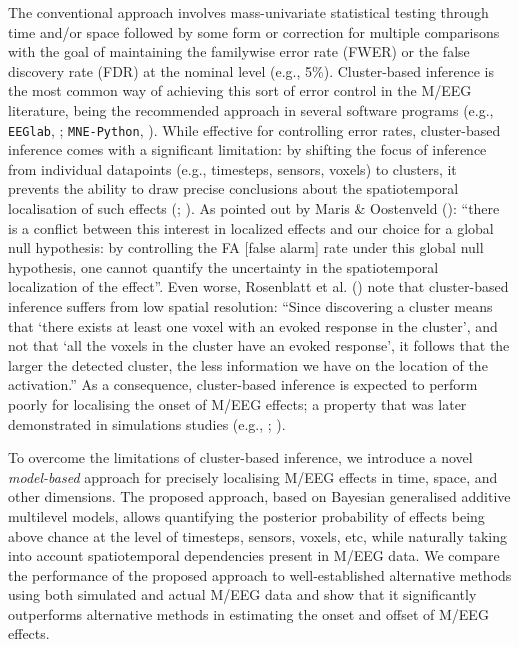 \documentclass[
  doc,
  floatsintext,
  longtable,
  a4paper,
  nolmodern,
  notxfonts,
  notimes,
  donotrepeattitle,
  colorlinks=true,linkcolor=blue,citecolor=blue,urlcolor=blue]{apa7}
\begin{document}
The conventional approach involves mass-univariate statistical testing
through time and/or space followed by some form or correction for
multiple comparisons with the goal of maintaining the familywise error
rate (FWER) or the false discovery rate (FDR) at the nominal level
(e.g., 5\%). Cluster-based inference is the most common way of achieving
this sort of error control in the M/EEG literature, being the
recommended approach in several software programs (e.g.,
\texttt{EEGlab}, ;
\texttt{MNE-Python}, ). While
effective for controlling error rates, cluster-based inference comes
with a significant limitation: by shifting the focus of inference from
individual datapoints (e.g., timesteps, sensors, voxels) to clusters, it
prevents the ability to draw precise conclusions about the
spatiotemporal localisation of such effects
(;
). As
pointed out by Maris \& Oostenveld ():
``there is a conflict between this interest in localized effects and our
choice for a global null hypothesis: by controlling the FA {[}false
alarm{]} rate under this global null hypothesis, one cannot quantify the
uncertainty in the spatiotemporal localization of the effect''. Even
worse, Rosenblatt et al. () note that
cluster-based inference suffers from low spatial resolution: ``Since
discovering a cluster means that `there exists at least one voxel with
an evoked response in the cluster', and not that `all the voxels in the
cluster have an evoked response', it follows that the larger the
detected cluster, the less information we have on the location of the
activation.'' As a consequence, cluster-based inference is expected to
perform poorly for localising the onset of M/EEG effects; a property
that was later demonstrated in simulations studies (e.g.,
;
).

To overcome the limitations of cluster-based inference, we introduce a
novel \emph{model-based} approach for precisely localising M/EEG effects
in time, space, and other dimensions. The proposed approach, based on
Bayesian generalised additive multilevel models, allows quantifying the
posterior probability of effects being above chance at the level of
timesteps, sensors, voxels, etc, while naturally taking into account
spatiotemporal dependencies present in M/EEG data. We compare the
performance of the proposed approach to well-established alternative
methods using both simulated and actual M/EEG data and show that it
significantly outperforms alternative methods in estimating the onset
and offset of M/EEG effects.
\end{document}
